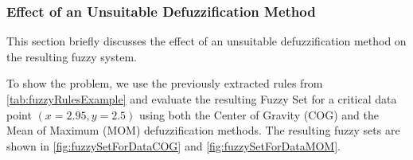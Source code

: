 \newpage

\subsubsection{Effect of an Unsuitable Defuzzification Method}

This section briefly discusses the effect of an unsuitable defuzzification method on the resulting fuzzy system.

To show the problem, we use the previously extracted rules from \autoref{tab:fuzzyRulesExample} and evaluate the resulting Fuzzy Set for a critical data point $(x=2.95, y=2.5)$ using both the Center of Gravity (COG) and the Mean of Maximum (MOM) defuzzification methods. The resulting fuzzy sets are shown in \autoref{fig:fuzzySetForDataCOG} and \autoref{fig:fuzzySetForDataMOM}.

